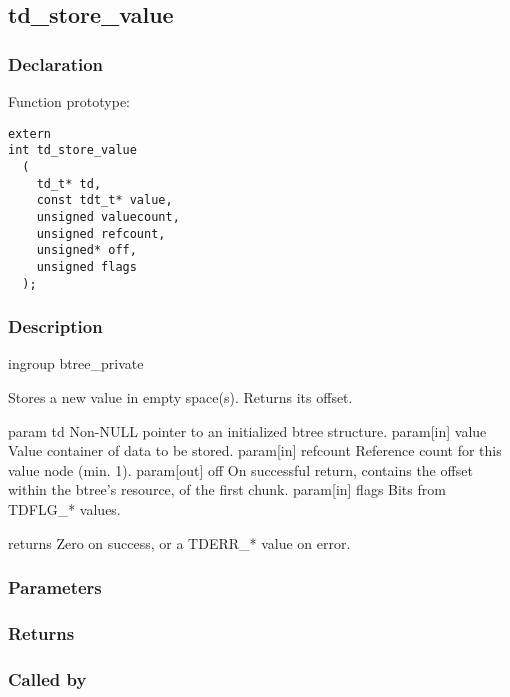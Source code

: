 
\newpage
\subsection{td\_store\_value}
\subsubsection{Declaration} Function prototype:

\begin{verbatim}
extern
int td_store_value
  (
    td_t* td,
    const tdt_t* value,
    unsigned valuecount,
    unsigned refcount,
    unsigned* off,
    unsigned flags
  );
\end{verbatim}

\subsubsection{Description}


 ingroup btree\_private

 Stores a new value in empty space(s). Returns its offset.

 param td Non-NULL pointer to an initialized btree structure.
 param[in] value Value container of data to be stored.
 param[in] refcount Reference count for this value node (min. 1).
 param[out] off On successful return, contains the offset within
 the btree's resource, of the first chunk.
 param[in] flags Bits from TDFLG\_* values.

 returns Zero on success, or a TDERR\_* value on error.
 

\subsubsection{Parameters}
\subsubsection{Returns}
\subsubsection{Called by}
